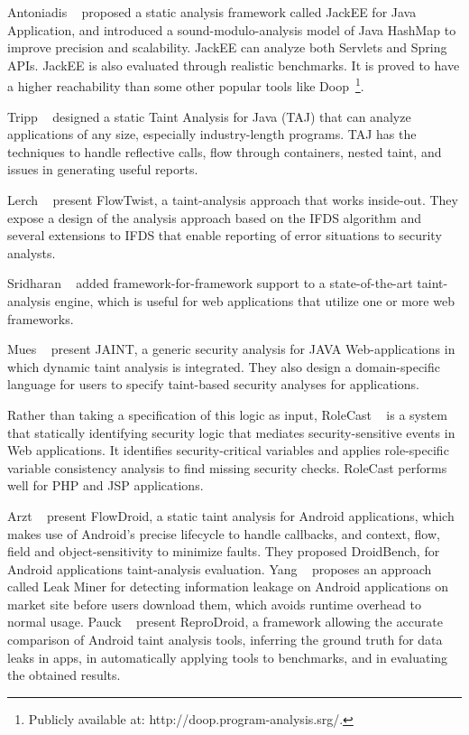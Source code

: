 Antoniadis \etal~\cite{Antoniadis+etal:2020:Java} proposed a static
analysis framework called JackEE for Java Application, and introduced a
sound-modulo-analysis model of Java HashMap to improve precision and
scalability. JackEE can analyze both Servlets and Spring APIs. JackEE is also
evaluated through realistic benchmarks. It is proved to have a higher
reachability than some other popular tools like Doop~\footnote{Publicly
  available at: http://doop.program-analysis.srg/.}.

Tripp \etal~\cite{10.1145/1542476.1542486} designed a static Taint Analysis for
Java (TAJ) that can analyze applications of any size, especially industry-length
programs. TAJ has the techniques to handle reflective calls, flow through
containers, nested taint, and issues in generating useful reports.

Lerch \etal~\cite{10.1145/2635868.2635878} present FlowTwist, a taint-analysis
approach that works inside-out. They expose a design of the analysis approach
based on the IFDS algorithm and several extensions to IFDS that enable reporting
of error situations to security analysts.

Sridharan \etal~\cite{10.1145/2076021.2048145} added framework-for-framework
support to a state-of-the-art taint-analysis engine, which is useful for web
applications that utilize one or more web frameworks.

Mues \etal~\cite{10.1007/978-3-030-63461-2_7} present JAINT, a generic security
analysis for JAVA Web-applications in which dynamic taint analysis is
integrated. They also design a domain-specific language for users to specify
taint-based security analyses for applications.

Rather than taking a specification of this logic as input, RoleCast
\etal~\cite{10.1145/2048066.2048146} is a system that statically identifying
security logic that mediates security-sensitive events in Web applications. It
identifies security-critical variables and applies role-specific variable
consistency analysis to find missing security checks. RoleCast performs well for
PHP and JSP applications.

Arzt \etal~\cite{10.1145/2594291.2594299} present FlowDroid, a static taint
analysis for Android applications, which makes use of Android's precise
lifecycle to handle callbacks, and context, flow, field and object-sensitivity
to minimize faults. They proposed DroidBench, for Android applications
taint-analysis evaluation. Yang \etal~\cite{6394931} proposes an approach called
Leak Miner for detecting information leakage on Android applications on market
site before users download them, which avoids runtime overhead to normal usage.
Pauck \etal~\cite{10.1145/3236024.3236029} present ReproDroid, a framework
allowing the accurate comparison of Android taint analysis tools, inferring the
ground truth for data leaks in apps, in automatically applying tools to
benchmarks, and in evaluating the obtained results.

